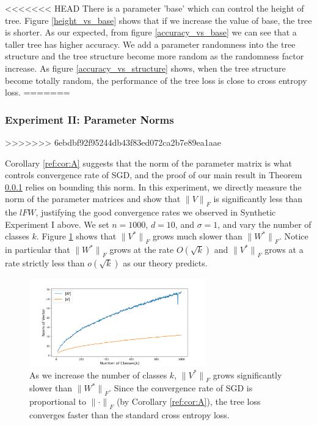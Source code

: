 \documentclass[twoside]{article}
\renewcommand{\star}[1]{{#1}^{*}}
\newcommand{\lF}[1]{{\lVert {#1} \rVert}_F}
\begin{document}
<<<<<<< HEAD
There is a parameter 'base' which can control the height of tree.
Figure \ref{height_vs_base} shows that if we increase the value of base, the tree is shorter.
As our expected, from figure \ref{accuracy_vs_base} we can see that a taller tree has higher accuracy. 
We add a parameter randomness into the tree structure and the tree structure become more random as the randomness factor increase.
As figure \ref{accuracy_vs_structure} shows, when the tree structure become totally random, the performance of the tree loss is close to cross entropy loss.
=======
\subsubsection{Experiment II: Parameter Norms}
>>>>>>> 6ebdbf92f95244db43f83ed072ca2b7e89ea1aae

Corollary \ref{ref:cor:A} suggests that the norm of the parameter matrix is what controls convergence rate of SGD,
and the proof of our main result in Theorem \ref{} relies on bounding this norm.
In this experiment, we directly measure the norm of the parameter matrices and show that $\lF{V}$ is significantly less than the $lF{W}$,
justifying the good convergence rates we observed in Synthetic Experiment I above.
We set $n=1000$, $d=10$, and $\sigma=1$, and vary the number of classes $k$.
Figure \ref{fig:synth:norm} shows that $\lF{\star V}$ grows much slower than $\lF{\star W}$.
Notice in particular that $\lF{\star W}$ grows at the rate $O(\sqrt{k})$ and $\lF{\star V}$ grows at a rate strictly less than $o(\sqrt{k})$ as our theory predicts.

\begin{figure}
\includegraphics[width=\columnwidth,height=1.5in]{fig/images/class_v_norm.png}
\caption{As we increase the number of classes $k$,
    $\lF{\star V}$ grows significantly slower than $\lF{\star W}$.
    Since the convergence rate of SGD is proportional to $\lF{\cdot}$ (by Corollary \ref{ref:cor:A}),
    the tree loss converges faster than the standard cross entropy loss. 
    }
\label{fig:synth:norm}
\end{figure}
\end{document}
